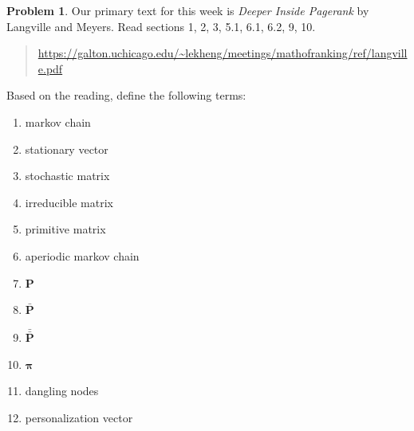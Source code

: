 \documentclass[10pt]{article}
\theoremstyle{definition}
\newtheorem{problem}{Problem}
\newcommand{\p}{\mathbf P}
\newcommand{\pb}{\bar {\p}}
\newcommand{\pbb}{\bar {\pb}}
\newcommand{\pr}{\bm \pi}
\begin{document}
\begin{problem}
    Our primary text for this week is \emph{Deeper Inside Pagerank} by Langville and Meyers.
    Read sections 1, 2, 3, 5.1, 6.1, 6.2, 9, 10.
    \begin{quote}
    \url{https://galton.uchicago.edu/~lekheng/meetings/mathofranking/ref/langville.pdf}
    \end{quote}
    Based on the reading, define the following terms:
    \begin{enumerate}
        \item markov chain
            \vspace{1in}
        \item stationary vector
            \vspace{1in}
        \item stochastic matrix
            \vspace{1in}
        \item irreducible matrix
            \vspace{1in}
        \item primitive matrix
            \vspace{1in}
        \item aperiodic markov chain
            \vspace{1in}
        \item $\p$
            \vspace{1in}
        \item $\pb$
            \vspace{1in}
        \item $\pbb$
            \vspace{1in}
        \item $\pr$
            \vspace{1in}
        \item dangling nodes
            \vspace{1in}
        \item personalization vector
            \vspace{1in}
    \end{enumerate}
\end{problem}


%
\end{document}
